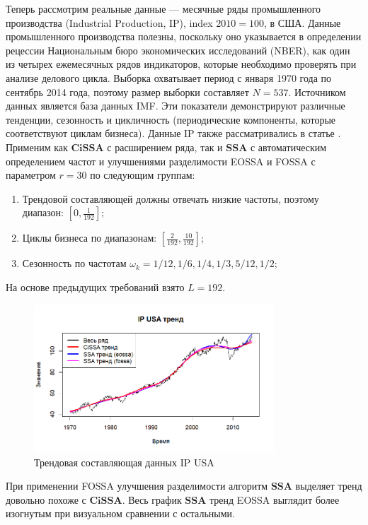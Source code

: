 \documentclass[a4paper, 11pt]{article}
\newcommand{\SSA}{\textbf{SSA}}
\newcommand{\CISSA}{\textbf{CiSSA}}
\begin{document}
Теперь рассмотрим реальные данные --- месячные ряды промышленного производства (Industrial Production, IP), index $2010 = 100$, в США. Данные промышленного производства полезны, поскольку оно указывается в определении рецессии Национальным бюро экономических исследований (NBER), как один из четырех ежемесячных рядов индикаторов, которые необходимо проверять при анализе делового цикла. Выборка охватывает период с января 1970 года по сентябрь 2014 года, поэтому размер выборки составляет $N = 537$. Источником данных является база данных IMF. Эти показатели демонстрируют различные тенденции, сезонность и цикличность (периодические компоненты, которые соответствуют циклам бизнеса). Данные IP также рассматривались в статье \cite{bogalo2020}. 
Применим как $\CISSA$ с расширением ряда, так и $\SSA$ с автоматическим определением частот и улучшениями разделимости EOSSA и FOSSA с параметром $r = 30$ по следующим группам:
\begin{enumerate}
	\item Трендовой составляющей должны отвечать низкие частоты, поэтому диапазон: $\left[0, \frac{1}{192}\right]$;
	\item Циклы бизнеса по диапазонам: $\left[\frac{2}{192}, \frac{10}{192}\right]$;
	\item Сезонность по частотам $\omega_k = 1/12, 1/6, 1/4, 1/3, 5/12, 1/2$;
\end{enumerate}
На основе предыдущих требований взято $L = 192$.

\begin{figure}[H]
	\centering
	\includegraphics[width=0.8\textwidth]{img/trend inseparability example/IP_trend.png}
	\caption{Трендовая составляющая данных IP USA}
	\label{fig:IP_trend}
\end{figure}

При применении FOSSA улучшения разделимости алгоритм $\SSA$ выделяет тренд довольно похоже с $\CISSA$. Весь график $\SSA$ тренд EOSSA выглядит более изогнутым при визуальном сравнении с остальными.
\end{document}
